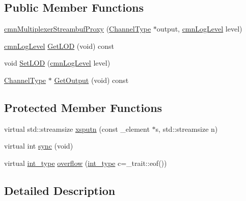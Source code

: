 \subsection*{Public Member Functions}
\begin{DoxyCompactItemize}
\item 
\hyperlink{classcmn_multiplexer_streambuf_proxy_a19cff8cb9fe6ab6410c1beeae2a13b59}{cmn\-Multiplexer\-Streambuf\-Proxy} (\hyperlink{classcmn_multiplexer_streambuf_proxy_aad26781c796870ad583a690f1d4132bb}{Channel\-Type} $\ast$output, \hyperlink{cmn_log_lo_d_8h_a70c67165c37a0971e0dd1a85d4edaaae}{cmn\-Log\-Level} level)
\item 
\hyperlink{cmn_log_lo_d_8h_a70c67165c37a0971e0dd1a85d4edaaae}{cmn\-Log\-Level} \hyperlink{classcmn_multiplexer_streambuf_proxy_a50f130ccf182f35f00d59f5b91890801}{Get\-L\-O\-D} (void) const 
\item 
void \hyperlink{classcmn_multiplexer_streambuf_proxy_ac89fbe628f8c171f1f8871b1641045e3}{Set\-L\-O\-D} (\hyperlink{cmn_log_lo_d_8h_a70c67165c37a0971e0dd1a85d4edaaae}{cmn\-Log\-Level} level)
\item 
\hyperlink{classcmn_multiplexer_streambuf_proxy_aad26781c796870ad583a690f1d4132bb}{Channel\-Type} $\ast$ \hyperlink{classcmn_multiplexer_streambuf_proxy_ae7ac63ce755124ec9943925052848cd9}{Get\-Output} (void) const 
\end{DoxyCompactItemize}
\subsection*{Protected Member Functions}
\begin{DoxyCompactItemize}
\item 
virtual std\-::streamsize \hyperlink{classcmn_multiplexer_streambuf_proxy_a43ad7db2163d7cc48b55be06686d285a}{xsputn} (const \-\_\-element $\ast$s, std\-::streamsize n)
\item 
virtual int \hyperlink{classcmn_multiplexer_streambuf_proxy_a7e7755a46401f3d10e6c1f2100af0a4d}{sync} (void)
\item 
virtual \hyperlink{classcmn_multiplexer_streambuf_proxy_ac600a28e3e3c860fc54ca7e7931bc6df}{int\-\_\-type} \hyperlink{classcmn_multiplexer_streambuf_proxy_a10a4e0b433962e191fcbff9b8238ed99}{overflow} (\hyperlink{classcmn_multiplexer_streambuf_proxy_ac600a28e3e3c860fc54ca7e7931bc6df}{int\-\_\-type} c=\-\_\-trait\-::eof())
\end{DoxyCompactItemize}


\subsection{Detailed Description}
